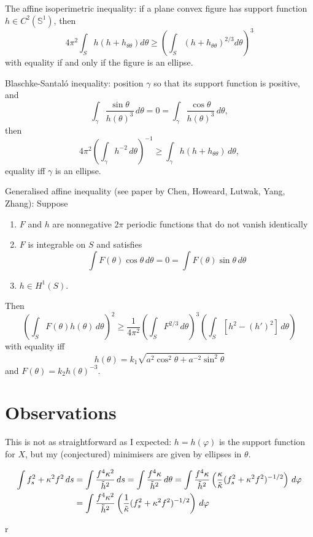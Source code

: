 \documentclass[12pt, a4paper]{amsart}
\theoremstyle{remark}
\begin{document}
The affine isoperimetric inequality:
 if a plane convex figure has support function $h\in C^2(\mathbb{S}^1)$, then
$$ 4\pi^2\int_{S}h(h+h_{\theta\theta})d\theta\ge \left(\int_S(h+h_{\theta\theta})^{2/3}d\theta\right)^3$$ 
with equality if and only if the figure is an ellipse.

Blaschke-Santal\'o inequality:  position $\gamma$ so that its support function is positive, and 
$$\int_\gamma \frac{\sin\theta}{h(\theta)^3}\,d\theta=0=\int_\gamma \frac{\cos\theta}{h(\theta)^3}\,d\theta,$$
then
$$4\pi^2\left(\int_\gamma h^{-2}\,d\theta\right)^{-1}\ge \int_\gamma h(h+h_{\theta\theta})\,d\theta,$$
equality iff $\gamma$ is an ellipse.   

Generalised affine inequality (see paper by Chen, Howeard, Lutwak, Yang, Zhang):
Suppose
\begin{enumerate}
\item $F$ and $h$ are nonnegative $2\pi$ periodic functions that do not vanish identically
\item $F$ is integrable on $S$ and satisfies
$$ \int F(\theta)\cos \theta \,d\theta=0= \int F(\theta)\sin \theta \,d\theta $$
\item $h\in H^1(S)$.
\end{enumerate}
Then 
$$\left(\int_S F(\theta)h(\theta)\,d\theta\right)^2\ge \frac 1{4\pi^2}   \left(\int_S F^{2/3}\,d\theta\right)^3  \left(\int_S  [h^2-(h')^2]   \,d\theta\right)$$
with equality iff
\begin{equation}
h(\theta)=k_1\sqrt{a^2 \cos^2 \theta + a^{-2}\sin^2\theta}\label{h for ellipse}\end{equation}
and $F(\theta)=k_2 h(\theta)^{-3}$.   

\section*{Observations}


This is not as straightforward as I expected:   $h=h(\varphi)$ is the support function for $X$, but my (conjectured) minimisers are given by ellipses in $\theta$.   

\begin{align*}\int f_s^2+\kappa^2 f^2 \,ds&= \int \frac{f^4\kappa^2}{\tilde{h}^2}\,ds= \int \frac{f^4\kappa}{\tilde{h}^2}\,d\theta
=\int \frac{f^4\kappa}{\tilde{h}^2}\left(\frac\kappa{\tilde{\kappa}}(f_s^2+\kappa^2f^2)^{-1/2}\right)\,d\varphi  \\
&=\int \frac{f^4\kappa^2}{\tilde{h}^2}\left(\frac1{\tilde{\kappa}}(f_s^2+\kappa^2f^2)^{-1/2}\right)\,d\varphi  
\end{align*}

r



 
\end{document}
